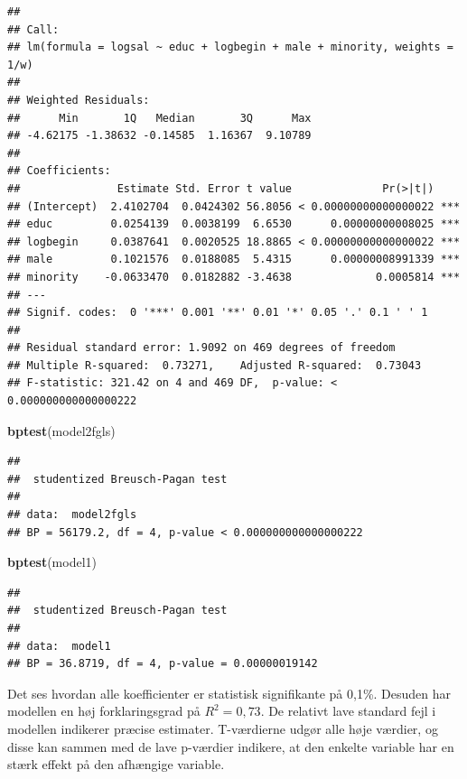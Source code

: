 \documentclass[
]{article}
\newenvironment{Shaded}{\begin{snugshade}}{\end{snugshade}}
\newcommand{\FunctionTok}[1]{\textcolor[rgb]{0.13,0.29,0.53}{\textbf{#1}}}
\newcommand{\NormalTok}[1]{#1}
\begin{document}
\begin{verbatim}
## 
## Call:
## lm(formula = logsal ~ educ + logbegin + male + minority, weights = 1/w)
## 
## Weighted Residuals:
##      Min       1Q   Median       3Q      Max 
## -4.62175 -1.38632 -0.14585  1.16367  9.10789 
## 
## Coefficients:
##               Estimate Std. Error t value              Pr(>|t|)    
## (Intercept)  2.4102704  0.0424302 56.8056 < 0.00000000000000022 ***
## educ         0.0254139  0.0038199  6.6530      0.00000000008025 ***
## logbegin     0.0387641  0.0020525 18.8865 < 0.00000000000000022 ***
## male         0.1021576  0.0188085  5.4315      0.00000008991339 ***
## minority    -0.0633470  0.0182882 -3.4638             0.0005814 ***
## ---
## Signif. codes:  0 '***' 0.001 '**' 0.01 '*' 0.05 '.' 0.1 ' ' 1
## 
## Residual standard error: 1.9092 on 469 degrees of freedom
## Multiple R-squared:  0.73271,    Adjusted R-squared:  0.73043 
## F-statistic: 321.42 on 4 and 469 DF,  p-value: < 0.000000000000000222
\end{verbatim}

\begin{Shaded}
\begin{Highlighting}[]
\FunctionTok{bptest}\NormalTok{(model2fgls)}
\end{Highlighting}
\end{Shaded}

\begin{verbatim}
## 
##  studentized Breusch-Pagan test
## 
## data:  model2fgls
## BP = 56179.2, df = 4, p-value < 0.000000000000000222
\end{verbatim}

\begin{Shaded}
\begin{Highlighting}[]
\FunctionTok{bptest}\NormalTok{(model1)}
\end{Highlighting}
\end{Shaded}

\begin{verbatim}
## 
##  studentized Breusch-Pagan test
## 
## data:  model1
## BP = 36.8719, df = 4, p-value = 0.00000019142
\end{verbatim}

Det ses hvordan alle koefficienter er statistisk signifikante på 0,1\%.
Desuden har modellen en høj forklaringsgrad på \(R^2 = 0,73\). De
relativt lave standard fejl i modellen indikerer præcise estimater.
T-værdierne udgør alle høje værdier, og disse kan sammen med de lave
p-værdier indikere, at den enkelte variable har en stærk effekt på den
afhængige variable.
\end{document}
